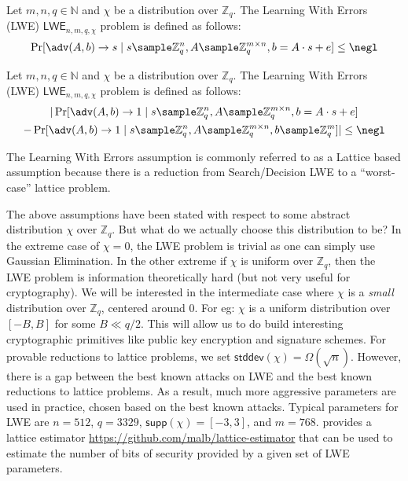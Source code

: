 \documentclass[12pt]{tufte-book}
\newcommand{\LWE}{\mathsf{LWE}} \usepackage{booktabs}
\begin{document}
\begin{definition}
    Let $m,n,q \in \mathbb{N}$ and $\chi$ be a distribution over $\mathbb{Z}_q$. The Learning With Errors (LWE) $\LWE_{n,m,q,\chi}$ problem is defined as follows:
    \[\Pr[\adv(A,b) \to s \mid s \sample \mathbb{Z}_q^n, A \sample \mathbb{Z}_q^{m \times n}, b = A \cdot s + e ] \leq \negl\]
\end{definition}

\begin{definition}
    Let $m,n,q \in \mathbb{N}$ and $\chi$ be a distribution over $\mathbb{Z}_q$. The Learning With Errors (LWE) $\LWE_{n,m,q,\chi}$ problem is defined as follows:
    \begin{multline*}
        |\Pr[\adv(A,b) \to 1 \mid s \sample \mathbb{Z}_q^n, A \sample \mathbb{Z}_q^{m \times n}, b = A \cdot s + e ] \\
        - \Pr[\adv(A,b) \to 1 \mid s \sample \mathbb{Z}_q^n, A \sample \mathbb{Z}_q^{m \times n}, b \sample \mathbb{Z}_q^m ]|\leq \negl
    \end{multline*}
\end{definition}
The Learning With Errors assumption is commonly referred to as a Lattice based assumption because there is a reduction from Search/Decision LWE to a ``worst-case'' lattice problem.

The above assumptions have been stated with respect to some abstract distribution $\chi$ over $\mathbb{Z}_q$. But what do we actually choose this distribution to be? In the extreme case of $\chi = 0$, the LWE problem is trivial as one can simply use Gaussian Elimination. In the other extreme if $\chi$ is uniform over $\mathbb{Z}_q$, then the LWE problem is information theoretically hard (but not very useful for cryptography). We will be interested in the intermediate case where $\chi$ is a \emph{small} distribution over $\mathbb{Z}_q$, centered around 0. For eg: $\chi$ is a uniform distribution over $[-B, B]$ for some $B \ll q/2$. This will allow us to do build interesting cryptographic primitives like public key encryption and signature schemes. For provable reductions to lattice problems, we set $\mathsf{stddev}(\chi) = \Omega(\sqrt{n})$. However, there is a gap between the best known attacks on LWE and the best known reductions to lattice problems. As a result, much more aggressive parameters are used in practice, chosen based on the best known attacks. Typical parameters for LWE are $n = 512$, $q = 3329$, $\mathsf{supp}(\chi) = [-3,3]$, and $m = 768$. \cite{EPRINT:AlbPlaSco15} provides a lattice estimator \url{https://github.com/malb/lattice-estimator} that can be used to estimate the number of bits of security provided by a given set of LWE parameters.
\end{document}

